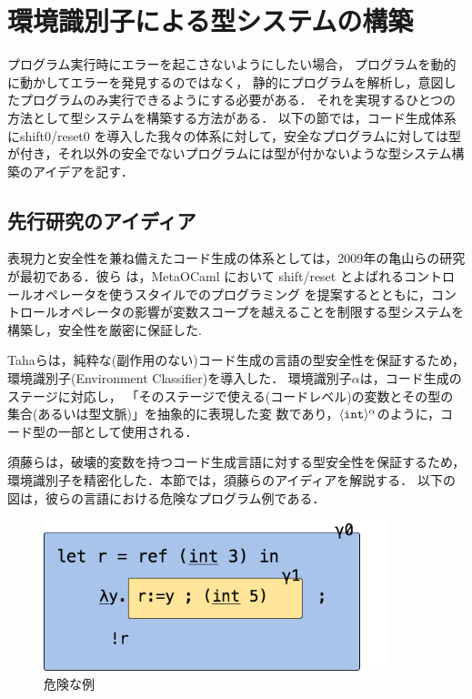 \chapter{環境識別子による型システムの構築}
プログラム実行時にエラーを起こさないようにしたい場合，
プログラムを動的に動かしてエラーを発見するのではなく，
静的にプログラムを解析し，意図したプログラムのみ実行できるようにする必要がある．
それを実現するひとつの方法として型システムを構築する方法がある．
以下の節では，コード生成体系にshift0/reset0 を導入した我々の体系に対して，安全なプログラムに対しては型が付き，それ以外の安全でないプログラムには型が付かないような型システム構築のアイデアを記す．

\section{先行研究のアイディア}
表現力と安全性を兼ね備えたコード生成の体系としては，2009年の亀山らの研究\cite{Kameyama2009}が最初である．彼ら は，MetaOCaml において shift/reset とよばれるコントロールオペレータを使うスタイルでのプログラミング を提案するとともに，コントロールオペレータの影響が変数スコープを越えることを制限する型システムを構築し，安全性を厳密に保証した.

Tahaら\cite{Taha:2003:EC:604131.604134}は，純粋な(副作用のない)コード生成の言語の型安全性を保証するため，
環境識別子(Environment Classifier)を導入した．
環境識別子$\alpha$は，コード生成のステージに対応し，
「そのステージで使える(コードレベル)の変数とその型の集合(あるいは型文脈)」を抽象的に表現した変
数であり，$\langle{\mbox{\texttt{int}}}\rangle^{\alpha}$のように，コード型の一部として使用される．

須藤ら\cite{Sudo2014}は，破壊的変数を持つコード生成言語に対する型安全性を保証するため，
環境識別子を精密化した．本節では，須藤らのアイディアを解説する．
以下の図は，彼らの言語における危険なプログラム例である．

\begin{figure}[ht]
  \centering
  \includegraphics[clip,width=10cm]{./img/sudo_ref.png}
  \caption{危険な例}
  \label{fig:sudo_ref}
\end{figure}


